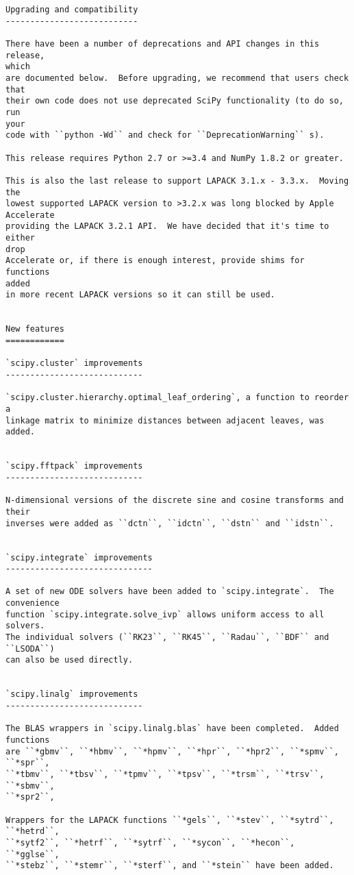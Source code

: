 \begin{verbatim}
Upgrading and compatibility
---------------------------

There have been a number of deprecations and API changes in this release,
which
are documented below.  Before upgrading, we recommend that users check that
their own code does not use deprecated SciPy functionality (to do so, run
your
code with ``python -Wd`` and check for ``DeprecationWarning`` s).

This release requires Python 2.7 or >=3.4 and NumPy 1.8.2 or greater.

This is also the last release to support LAPACK 3.1.x - 3.3.x.  Moving the
lowest supported LAPACK version to >3.2.x was long blocked by Apple
Accelerate
providing the LAPACK 3.2.1 API.  We have decided that it's time to either
drop
Accelerate or, if there is enough interest, provide shims for functions
added
in more recent LAPACK versions so it can still be used.


New features
============

`scipy.cluster` improvements
----------------------------

`scipy.cluster.hierarchy.optimal_leaf_ordering`, a function to reorder a
linkage matrix to minimize distances between adjacent leaves, was added.


`scipy.fftpack` improvements
----------------------------

N-dimensional versions of the discrete sine and cosine transforms and their
inverses were added as ``dctn``, ``idctn``, ``dstn`` and ``idstn``.


`scipy.integrate` improvements
------------------------------

A set of new ODE solvers have been added to `scipy.integrate`.  The
convenience
function `scipy.integrate.solve_ivp` allows uniform access to all solvers.
The individual solvers (``RK23``, ``RK45``, ``Radau``, ``BDF`` and
``LSODA``)
can also be used directly.


`scipy.linalg` improvements
----------------------------

The BLAS wrappers in `scipy.linalg.blas` have been completed.  Added
functions
are ``*gbmv``, ``*hbmv``, ``*hpmv``, ``*hpr``, ``*hpr2``, ``*spmv``,
``*spr``,
``*tbmv``, ``*tbsv``, ``*tpmv``, ``*tpsv``, ``*trsm``, ``*trsv``, ``*sbmv``,
``*spr2``,

Wrappers for the LAPACK functions ``*gels``, ``*stev``, ``*sytrd``,
``*hetrd``,
``*sytf2``, ``*hetrf``, ``*sytrf``, ``*sycon``, ``*hecon``, ``*gglse``,
``*stebz``, ``*stemr``, ``*sterf``, and ``*stein`` have been added.


\end{verbatim}
